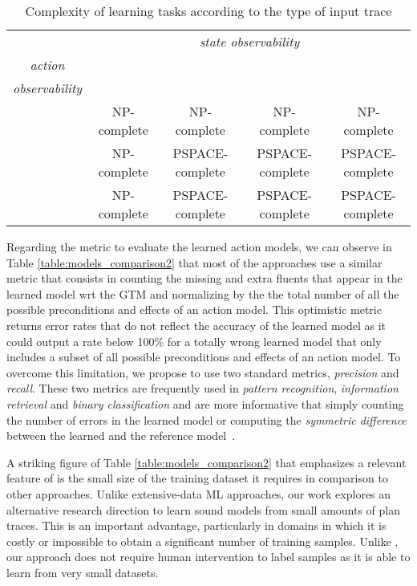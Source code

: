 \begin{table}[ht]
\centering
\begin{tabular}{c|c|c|c|c|}
	& \multicolumn{4}{c|}{\emph{state observability}} \\ \cline{2-5}
	\multirow{1}{*}{\emph{action}} & \FO & \PO & \POstar & \NO\\ {\emph{observability}} & & & & \\ \hline
	\FO & NP-complete & NP-complete & NP-complete & NP-complete \\ \hline
	\PO & NP-complete & PSPACE-complete & PSPACE-complete & PSPACE-complete \\ \hline
	\NO & NP-complete & PSPACE-complete & PSPACE-complete & PSPACE-complete\\ \hline
\end{tabular}
\caption{Complexity of learning tasks according to the type of input trace}
\label{tab:complex}
\end{table}


Regarding the metric to evaluate the learned action models, we can observe in Table \ref{table:models_comparison2} that most of the approaches use a similar metric that consists in counting the missing and extra fluents that appear in the learned model wrt the GTM and normalizing by the the total number of all the possible preconditions and effects of an action model. This optimistic metric returns error rates that do not reflect the accuracy of the learned model as it could output a rate below 100\% for a totally wrong learned model that only includes a subset of all possible preconditions and effects of an action model. To overcome this limitation, we propose to use two standard metrics, {\em precision} and {\em recall}. These two metrics are frequently used in {\em pattern recognition}, {\em information retrieval} and {\em binary classification} and are more informative that simply counting the number of errors in the learned model or computing the {\em symmetric difference} between the learned and the reference model~\cite{davis2006relationship}.

A striking figure of Table \ref{table:models_comparison2} that emphasizes a relevant feature of \FAMA is the small size of the training dataset it requires in comparison to other approaches. Unlike extensive-data ML approaches, our work explores an alternative research direction to learn sound models from small amounts of plan traces. This is an important advantage, particularly in domains in which it is costly or impossible to obtain a significant number of training samples. Unlike \CAMA, our approach does not require human intervention to label samples as it is able to learn from very small datasets.

